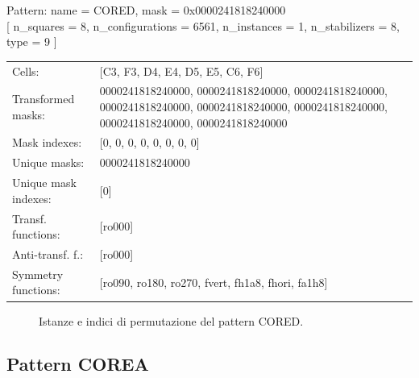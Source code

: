 \begin{tcolorbox}[sharp corners, fontupper=\ttfamily\small, colback=white]
  \noindent Pattern: name = CORED, mask = 0x0000241818240000\\
  {[} n\_squares = 8, n\_configurations = 6561,
  n\_instances = 1, n\_stabilizers = 8, type = 9 { ]}\\[1.0ex]
  \begin{tabularx}{\textwidth}{@{} p{3.5cm} X @{}}
    Cells:               & {[}C3, F3, D4, E4, D5, E5, C6, F6{]}\\[0.5ex]
    Transformed masks:   & 0000241818240000, 0000241818240000, 0000241818240000, 0000241818240000, 0000241818240000, 0000241818240000, 0000241818240000, 0000241818240000\\[0.5ex]
    Mask indexes:        & {[}0, 0, 0, 0, 0, 0, 0, 0{]}\\[0.5ex]
    Unique masks:        & 0000241818240000\\[0.5ex]
    Unique mask indexes: & {[}0{]}\\[0.5ex]
    Transf. functions:   & {[}ro000{]}\\[0.5ex]
    Anti-transf. f.:     & {[}ro000{]}\\[0.5ex]
    Symmetry functions:  & {[}ro090, ro180, ro270, fvert, fh1a8, fhori, fa1h8{]}\\[0.5ex]
  \end{tabularx}
\end{tcolorbox}

\begin{figure}[htbp]
  \centering
   \hfill
   \hfill
   \hfill
  \vspace{0.3cm}
   \hfill
   \hfill
   \hfill
  \caption{Istanze e indici di permutazione del pattern CORED.}
\end{figure}

\newpage

\subsection{Pattern COREA}

